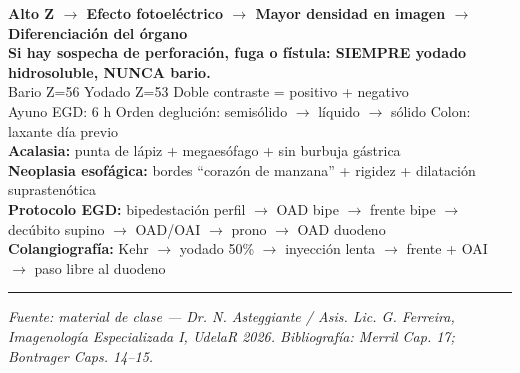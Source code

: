 \begin{cajakeypoints}
	\begin{center}
		\textbf{\color{azulprincipal}
			Alto Z $\rightarrow$ Efecto fotoeléctrico $\rightarrow$ Mayor densidad en imagen $\rightarrow$ Diferenciación del órgano}\\[0.4em]
		\textbf{\color{naranjadestacado}
			Si hay sospecha de perforación, fuga o fístula: SIEMPRE yodado hidrosoluble, NUNCA bario.}\\[0.3em]
		Bario Z=56 \quad Yodado Z=53 \quad Doble contraste = positivo + negativo\\[0.3em]
		Ayuno EGD: 6 h \quad Orden deglución: semisólido $\to$ líquido $\to$ sólido \quad Colon: laxante día previo\\[0.3em]
		\textbf{Acalasia:} punta de lápiz + megaesófago + sin burbuja gástrica\\[0.3em]
		\textbf{Neoplasia esofágica:} bordes ``corazón de manzana'' + rigidez + dilatación suprastenótica\\[0.3em]
		\textbf{Protocolo EGD:} bipedestación perfil $\to$ OAD bipe $\to$ frente bipe $\to$ decúbito supino $\to$ OAD/OAI $\to$ prono $\to$ OAD duodeno\\[0.3em]
		\textbf{Colangiografía:} Kehr $\to$ yodado 50\% $\to$ inyección lenta $\to$ frente + OAI $\to$ paso libre al duodeno
	\end{center}
\end{cajakeypoints}

\vspace{1em}
\hrule
\vspace{0.5em}
{\footnotesize \textit{Fuente: material de clase --- Dr. N. Asteggiante / Asis. Lic. G. Ferreira,
		Imagenología Especializada I, UdelaR 2026. Bibliografía: Merril Cap. 17; Bontrager Caps. 14--15.}}